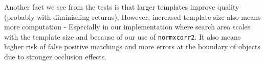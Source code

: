 \documentclass[12pt,a4paper,oneside,final]{article}
\begin{document}
	\fi
	Another fact we see from the tests is that larger templates improve quality (probably with diminishing returns); However, increased template size also means more computation - Especially in our implementation where search area scales with the template size and because of our use of \texttt{normxcorr2}. It also means higher risk of false positive matchings and more errors at the boundary of objects due to stronger occlusion effects.\\\\

	
\end{document}
